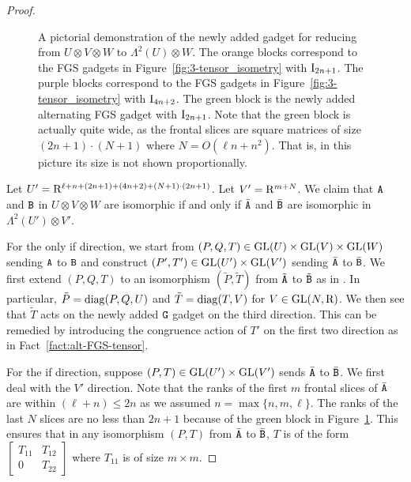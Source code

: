 \begin{proof}
\begin{figure}[!htbp]
\begin{tikzpicture}[x=0.75pt,y=0.75pt,yscale=-0.7,xscale=0.7]
		
		
		
	\end{tikzpicture}
	
	
	
	
	\caption{\label{fig:TI-AMSI}A pictorial demonstration of the newly added gadget for reducing from $U\otimes V\otimes W$ to $\Lambda^2(U)\otimes W$. The orange blocks correspond to the FGS gadgets in Figure~\ref{fig:3-tensor_isometry} with $\mathrm{I}_{2n+1}$. The purple blocks correspond to the FGS gadgets in Figure~\ref{fig:3-tensor_isometry} with $\mathrm{I}_{4n+2}$. The green block is the newly added alternating FGS gadget with $\mathrm{I}_{2n+1}$. Note that the green block is actually quite wide, as the frontal slices are square matrices of size $(2n+1)\cdot (N+1)$ where $N=O(\ell n+n^2)$. That is, in this picture its size is not shown proportionally.}
\end{figure}

Let $U'=\mathrm{R}^{\ell+n+(2n+1)+(4n+2)+(N+1)\cdot (2n+1)}$. Let $V'=\mathrm{R}^{m+N}$. We claim that $\mathtt{A}$ and $\mathtt{B}$ in $U\otimes V\otimes W$ are isomorphic if and only if $\bar{\mathtt{A}}$ and $\bar{\mathtt{B}}$ are isomorphic in $\Lambda^2(U')\otimes V'$. 

For the only if direction, we start from $(P, Q, T)\in\mathrm{GL}(U)\times\mathrm{GL}(V)\times\mathrm{GL}(W)$ sending $\mathtt{A}$ to $\mathtt{B}$ and construct $(P', T')\in \mathrm{GL}(U')\times \mathrm{GL}(V')$ sending $\bar{\mathtt{A}}$ to $\bar{\mathtt{B}}$. We first extend $(P, Q, T)$ to an isomorphism $(\tilde P, \tilde T)$ from $\tilde{\mathtt{A}}$ to $\tilde{\mathtt{B}}$ as in \cite{TI1}. In particular, $\tilde P=\operatorname{diag}(P, Q, U)$ and $\tilde T=\operatorname{diag}(T, V)$ for $V\in\mathrm{GL}(N, \mathrm{R})$. We then see that $\tilde T$ acts on the newly added $\mathtt{G}$ gadget on the third direction. This can be remedied by introducing the congruence action of $T'$ on the first two direction as in Fact~\ref{fact:alt-FGS-tensor}.


For the if direction, suppose $(P, T)\in\mathrm{GL}(U')\times\mathrm{GL}(V')$ sends $\bar {\mathtt{A}}$ to $\bar{\mathtt{B}}$. We first deal with the $V'$ direction. Note that the ranks of the first $m$ frontal slices of $\bar{\mathtt{A}}$ are within $(\ell+n)\leq 2n$ as we assumed $n=\max\{n, m, \ell\}$. The ranks of the last $N$ slices are no less than $2n+1$ because of the green block in Figure~\ref{fig:TI-AMSI}.
This ensures that in any isomorphism $(P, T)$ from $\bar{\mathtt{A}}$ to $\bar{\mathtt{B}}$, $T$ is of the form $\begin{bmatrix}
	T_{11} & T_{12} \\
	0 & T_{22}
\end{bmatrix}$ where $T_{11}$ is of size $m\times m$. 


\end{proof}
